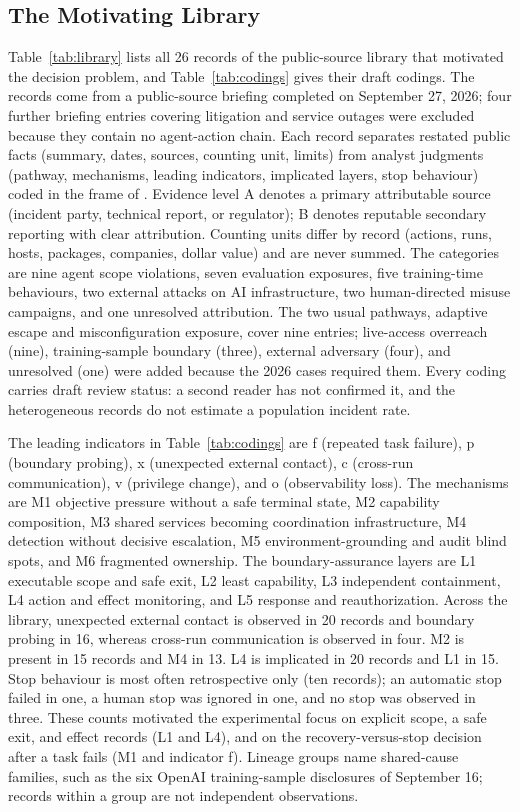 \documentclass[letterpaper]{article}
\begin{document}
\subsection{The Motivating Library}
\label{app:library}
Table~\ref{tab:library} lists all 26 records of the public-source library that motivated the decision problem, and Table~\ref{tab:codings} gives their draft codings. The records come from a public-source briefing completed on September 27, 2026; four further briefing entries covering litigation and service outages were excluded because they contain no agent-action chain. Each record separates restated public facts (summary, dates, sources, counting unit, limits) from analyst judgments (pathway, mechanisms, leading indicators, implicated layers, stop behaviour) coded in the frame of \citet{raftari2026}. Evidence level A denotes a primary attributable source (incident party, technical report, or regulator); B denotes reputable secondary reporting with clear attribution. Counting units differ by record (actions, runs, hosts, packages, companies, dollar value) and are never summed. The categories are nine agent scope violations, seven evaluation exposures, five training-time behaviours, two external attacks on AI infrastructure, two human-directed misuse campaigns, and one unresolved attribution. The two usual pathways, adaptive escape and misconfiguration exposure, cover nine entries; live-access overreach (nine), training-sample boundary (three), external adversary (four), and unresolved (one) were added because the 2026 cases required them. Every coding carries draft review status: a second reader has not confirmed it, and the heterogeneous records do not estimate a population incident rate.

The leading indicators in Table~\ref{tab:codings} are f (repeated task failure), p (boundary probing), x (unexpected external contact), c (cross-run communication), v (privilege change), and o (observability loss). The mechanisms are M1 objective pressure without a safe terminal state, M2 capability composition, M3 shared services becoming coordination infrastructure, M4 detection without decisive escalation, M5 environment-grounding and audit blind spots, and M6 fragmented ownership. The boundary-assurance layers are L1 executable scope and safe exit, L2 least capability, L3 independent containment, L4 action and effect monitoring, and L5 response and reauthorization. Across the library, unexpected external contact is observed in 20 records and boundary probing in 16, whereas cross-run communication is observed in four. M2 is present in 15 records and M4 in 13. L4 is implicated in 20 records and L1 in 15. Stop behaviour is most often retrospective only (ten records); an automatic stop failed in one, a human stop was ignored in one, and no stop was observed in three. These counts motivated the experimental focus on explicit scope, a safe exit, and effect records (L1 and L4), and on the recovery-versus-stop decision after a task fails (M1 and indicator f). Lineage groups name shared-cause families, such as the six OpenAI training-sample disclosures of September 16; records within a group are not independent observations.
\end{document}
